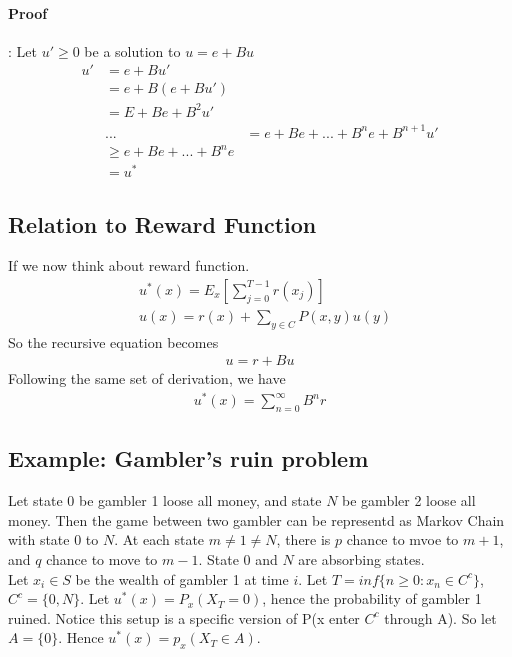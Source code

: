 \paragraph{Proof}: Let $u'\geq 0$ be a solution to $u = e + Bu$
    \begin{align*}
        u' 
        & = e + Bu'\\
        & = e + B(e + Bu')\\
        & = E + Be + B^2 u'\\
        & ...
        & = e + Be + ... + B^ne + B^{n+1}u'\\
        & \geq  e + Be + ... + B^ne \tag{Both $B$ and $u'$ is non-negative} \\
        & = u^*
    \end{align*}
    
\subsection{Relation to Reward Function} 
If we now think about reward function. 
    \begin{align*}
        & u^*(x) = E_x[\sum_{j=0}^{T-1} r(x_j)]\\
        & u(x) = r(x) + \sum_{y\in C}P(x,y)u(y)
    \end{align*}
So the recursive equation becomes 
    \begin{align*}
        u = r + Bu
    \end{align*}
Following the same set of derivation, we have 
    \begin{align*}
        u^*(x) = \sum_{n=0}^\infty B^n r
    \end{align*}
    
\subsection{Example: Gambler's ruin problem} 
Let state 0 be gambler 1 loose all money, and state $N$ be gambler 2 loose all money. Then the game between two gambler can be representd as Markov Chain with state 0 to $N$. At each state $m\neq 1 \neq N$, there is $p$ chance to mvoe to $m+1$, and $q$ chance to move to $m-1$. State $0$ and $N$ are absorbing states. \\

Let $x_i \in S$ be the wealth of gambler 1 at time $i$. Let $T = inf\{n\geq 0: x_n \in C^c\}$, $C^c = \{ 0, N \}$. Let $u^*(x) = P_x(X_T = 0)$, hence the probability of gambler 1 ruined. Notice this setup is a specific version of P(x enter $C^c$ through A). So let $A = \{ 0 \}$. Hence $u^*(x) = p_x(X_T\in A)$. \\

